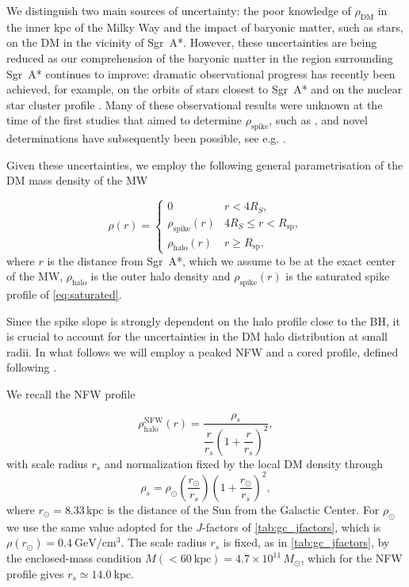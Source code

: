We distinguish two main sources of uncertainty:
the poor knowledge of $\rho_{\mathrm{DM}}$ in the inner kpc of the Milky Way
and the impact of baryonic matter, such as stars, on the DM in the vicinity of Sgr~A*. However,
these uncertainties are being reduced as our comprehension of the baryonic matter in the region
surrounding Sgr~A* continues to improve: dramatic observational progress has recently been achieved, for example, on the
orbits of stars closest to Sgr~A* \cite{GRAVITY2022, Heissel2022} and on
the nuclear star cluster profile \cite{Habibi2019, Pechetti2020, GallegoCano2020}.
Many of these observational results were unknown at the time
of the first studies that aimed to determine $\rho_{\mathrm{spike}}$, such as \cite{Ullio_2001}, and novel determinations have subsequently been possible, see e.g. \cite{Shapiro2022}.



Given these uncertainties, we employ the following general parametrisation of the DM mass density of the MW

\begin{equation}
\rho(r) =
\begin{cases}
0 & r < 4R_S, \\[4pt]
\rho_{\mathrm{spike}}(r) & 4R_S \leq r < R_{\mathrm{sp}}, \\[4pt]
\rho_{\mathrm{halo}}(r) & r \geq R_{\mathrm{sp}},
\end{cases}
\label{eq:parametrisation}
\end{equation}
where $r$ is the distance from Sgr~A*, which we assume to be at the exact center of the MW, $\rho_{\mathrm{halo}}$ is the outer halo density and
$\rho_{\mathrm{spike}}(r)$ is the saturated spike profile of \cref{eq:saturated}.

Since the spike slope is strongly dependent on the halo profile close to the BH, it is
crucial to account for the uncertainties in the DM halo distribution at small radii. In what follows we
will employ a peaked NFW and a cored profile, defined following \cite{balaji2023darkmatterspikessgr}.

We recall the NFW profile

\begin{equation}
\rho_{\mathrm{halo}}^{\mathrm{NFW}}(r)
=
\frac{\rho_s}{\dfrac{r}{r_s}\left(1+\dfrac{r}{r_s}\right)^{2}},
\label{eq:nfw}
\end{equation}
with scale radius $r_s$ and normalization fixed by the local
DM density through
\begin{equation}
\rho_s
=
\rho_\odot
\left(\frac{r_\odot}{r_s}\right)
\left(1+\frac{r_\odot}{r_s}\right)^2,
\end{equation}
where $r_\odot = 8.33\,\mathrm{kpc}$ is the distance of the Sun from the Galactic
Center. For $\rho_\odot$ we use the same value adopted for the $J$-factors of
\cref{tab:gc_jfactors}, which is \(\rho(r_\odot)=0.4~\mathrm{GeV/cm^3}\). The scale radius $r_s$ is fixed, as in
\cref{tab:gc_jfactors}, by the enclosed-mass condition
$M(<60~\mathrm{kpc}) = 4.7\times 10^{11}\,M_\odot$, which for the NFW
profile gives $r_s \simeq 14.0~\mathrm{kpc}$.


